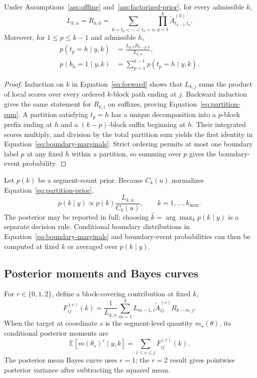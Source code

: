 \begin{theorem}
\label{thm:sum-product}
Under Assumptions~\ref{ass:offline} and~\ref{ass:factorized-prior}, for every admissible $k$,
\begin{equation}
L_{k,n}=R_{k,0}
=\sum_{0=t_0<\cdots<t_k=n}\prod_{q=1}^{k}\widetilde A^{(0)}_{t_{q-1},t_q}.
\label{eq:partition-sum}
\end{equation}
Moreover, for $1\le p\le k-1$ and admissible $h$,
\begin{align}
p(t_p=h\mid y,k)
&=\frac{L_{p,h}R_{k-p,h}}{L_{k,n}},\nonumber\\
p(b_h=1\mid y,k)
&=\sum_{p=1}^{k-1}p(t_p=h\mid y,k).
\label{eq:boundary-marginals}
\end{align}
\end{theorem}
\begin{proof}
Induction on $k$ in Equation~\eqref{eq:forward} shows that $L_{k,j}$ sums the product of local scores over every ordered $k$-block path ending at $j$. Backward induction gives the same statement for $R_{k,i}$ on suffixes, proving Equation~\eqref{eq:partition-sum}. A partition satisfying $t_p=h$ has a unique decomposition into a $p$-block prefix ending at $h$ and a $(k-p)$-block suffix beginning at $h$. Their integrated scores multiply, and division by the total partition sum yields the first identity in Equation~\eqref{eq:boundary-marginals}. Strict ordering permits at most one boundary label $p$ at any fixed $h$ within a partition, so summing over $p$ gives the boundary-event probability.
\end{proof}

Let $p(k)$ be a segment-count prior. Because $C_k(u)$ normalizes Equation~\eqref{eq:partition-prior},
\begin{equation}
 p(k\mid y)\propto p(k)\frac{L_{k,n}}{C_k(u)},
 \qquad k=1,\ldots,k_{\max}.
\label{eq:k-posterior}
\end{equation}
The posterior may be reported in full; choosing $\widehat k=\arg\max_k p(k\mid y)$ is a separate decision rule. Conditional boundary distributions in Equation~\eqref{eq:boundary-marginals} and boundary-event probabilities can then be computed at fixed $k$ or averaged over $p(k\mid y)$.

\subsection{Posterior moments and Bayes curves}
For $r\in\{0,1,2\}$, define a block-covering contribution at fixed $k$,
\begin{equation}
F^{(r)}_{ij}(k)
=\frac{1}{L_{k,n}}
  \sum_{m=1}^{k}L_{m-1,i}\widetilde A^{(r)}_{ij}R_{k-m,j}.
\label{eq:block-cover}
\end{equation}
When the target at coordinate $s$ is the segment-level quantity $m_\star(\theta)$, its conditional posterior moments are
\begin{equation}
\mathbb E\!\left[m(\theta_s)^r\mid y,k\right]
 =\sum_{i<s\le j}F^{(r)}_{ij}(k).
\label{eq:bayes-curve}
\end{equation}
The posterior mean Bayes curve uses $r=1$; the $r=2$ result gives pointwise posterior variance after subtracting the squared mean.

